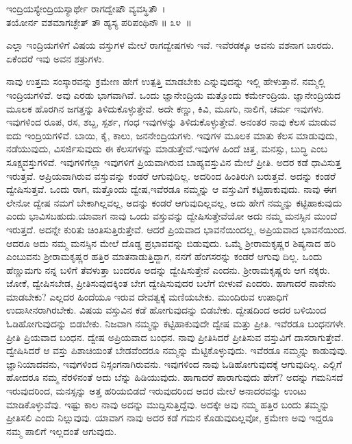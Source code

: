 \begin{shloka}
ಇಂದ್ರಿಯಸ್ಯೇಂದ್ರಿಯಸ್ಯಾರ್ಥೇ ರಾಗದ್ವೇಷೌ ವ್ಯವಸ್ಥಿತೌ~।\\ತಯೋರ್ನ ವಶಮಾಗಚ್ಛೇತ್ ತೌ ಹ್ಯಸ್ಯ ಪರಿಪಂಥಿನೌ \hfill॥ ೩೪~॥
\end{shloka}

\begin{artha}
ಎಲ್ಲಾ ಇಂದ್ರಿಯಗಳಿಗೆ ವಿಷಯ ವಸ್ತುಗಳ ಮೇಲೆ ರಾಗದ್ವೇಷಗಳು ಇವೆ. ಇವೆರಡಕ್ಕೂ ಅವನು ವಶನಾಗ ಬಾರದು. ಏಕೆಂದರೆ ಇವು ಅವನ ಶತ್ರುಗಳು.
\end{artha}

ನಾವು ಉತ್ತಮ ಸಂಸ್ಕಾರವನ್ನು ಕ್ರಮೇಣ ಹೇಗೆ ಉತ್ಪತ್ತಿ ಮಾಡಬೇಕು ಎನ್ನುವುದನ್ನು ಇಲ್ಲಿ ಹೇಳುತ್ತಾನೆ. ನಮ್ಮಲ್ಲಿ ಇಂದ್ರಿಯಗಳಿವೆ. ಅವು ಎರಡು ಭಾಗವಾಗಿವೆ. ಒಂದು ಜ್ಞಾನೇಂದ್ರಿಯ ಮತ್ತೊಂದು ಕರ್ಮೇಂದ್ರಿಯ. ಜ್ಞಾನೇಂದ್ರಿಯದ ಮೂಲಕ ಹೊರಗಿನ ಜಗತ್ತನ್ನು ತಿಳಿದುಕೊಳ್ಳುತ್ತೇವೆ. ಅದೇ ಕಣ್ಣು, ಕಿವಿ, ಮೂಗು, ನಾಲಿಗೆ, ಚರ್ಮ ಇವುಗಳು. ಇವುಗಳಿಂದ ರೂಪ, ರಸ, ಶಬ್ದ, ಸ್ಪರ್ಶ, ಗಂಧ ಇವುಗಳನ್ನು ತಿಳಿದುಕೊಳ್ಳುತ್ತೇವೆ. ಅನಂತರ ನಾವು ಕೆಲಸ ಮಾಡುವ ಐದು ಇಂದ್ರಿಯಗಳಿವೆ. ಬಾಯಿ, ಕೈ, ಕಾಲು, ಜನನೇಂದ್ರಿಯಗಳು. ಇವುಗಳ ಮೂಲಕ ಮಾತು ಕೆಲಸ ಮಾಡುವುದು, ನಡೆಯುವುದು, ವಿಸರ್ಜಿಸುವುದು ಈ ಕೆಲಸಗಳನ್ನು ಮಾಡುತ್ತೇವೆ.\break ಇವುಗಳ ಹಿಂದೆ ಚಿತ್ತ, ಮನಸ್ಸು, ಬುದ್ಧಿ ಎಂಬ ಸೂಕ್ಷ್ಮವಸ್ತುಗಳಿವೆ. ಇವುಗಳಿಗೆಲ್ಲಾ ಇವುಗಳಿಗೆ ಪ್ರಿಯವಾಗಿರುವ ಬಾಹ್ಯವಸ್ತುವಿನ ಮೇಲೆ ಪ್ರೀತಿ. ಅದರ ಕಡೆ ಧಾವಿಸುತ್ತ ಇರುತ್ತವೆ. ಅಪ್ರಿಯವಾಗಿರುವ ವಸ್ತುವನ್ನು ಕಂಡರೆ ಆಗುವುದಿಲ್ಲ. ಅದರಿಂದ ಹಿಂತಿರುಗಿ ಬರುತ್ತವೆ. ಅದನ್ನು ಕಂಡರೆ ದ್ವೇಷಿಸುತ್ತವೆ. ಒಂದು ರಾಗ, ಮತ್ತೊಂದು ದ್ವೇಷ,ಇವೆರಡೂ ನಮ್ಮನ್ನು ಆ ವಸ್ತುವಿಗೆ ಕಟ್ಟಿಹಾಕುವುದು. ನಾವು ಈಗ ಲೇನೋ ದ್ವೇಷ ನಮಗೆ ಬೇಕಾಗಿಲ್ಲವಲ್ಲ, ಅದನ್ನು ಕಂಡರೆ ಆಗುವುದಿಲ್ಲವಲ್ಲ, ಅದು ಹೇಗೆ ನಮ್ಮನ್ನು ಕಟ್ಟಿಹಾಕುವುದು ಎಂದು ಭಾವಿಸಬಹುದು.\break ಯಾವಾಗ ನಾವು ಒಂದು ವಸ್ತುವನ್ನು ದ್ವೇಷಿಸುತ್ತೇವೆಯೋ ಅದು ನಮ್ಮ ಮನಸ್ಸಿನ ಮುಂದೆ ಇರುತ್ತದೆ. ಅದನ್ನೇ ಕುರಿತು ಚಿಂತಿಸುತ್ತಿರುತ್ತೇವೆ. ಆದರೆ ಪ್ರಿಯವಾದ ಭಾವನೆಯಿಂದಲ್ಲ, ಅಪ್ರಿಯವಾದ ಭಾವನೆಯಿಂದ. ಆದರೂ ಅದು ನಮ್ಮ ಮನಸ್ಸಿನ ಮೇಲೆ ದೊಡ್ಡ ಪ್ರಭಾವವನ್ನು ಬಿಡುವುದು. ಒಮ್ಮೆ ಶ‍್ರೀರಾಮಕೃಷ್ಣರ ಶಿಷ್ಯನಾದ ಹರಿ ಎಂಬುವನು ಶ‍್ರೀರಾಮಕೃಷ್ಣರ ಹತ್ತಿರ ಮಾತನಾಡುತ್ತಿದ್ದಾಗ, ನನಗೆ ಹೆಂಗಸರನ್ನು ಕಂಡರೆ ಆಗುವು ದಿಲ್ಲ. ಒಂದು ಹೆಣ್ಣುಮಗು ನನ್ನ ಬಳಿಗೆ ತೆವಳುತ್ತಾ ಬಂದರೂ ಅದನ್ನು ದ್ವೇಷಿಸುತ್ತೇನೆ ಎಂದನು. ಶ‍್ರೀರಾಮಕೃಷ್ಣರು ಆಗ ನಕ್ಕರು. ಜೋಕೆ, ದ್ವೇಷಿಸಬೇಡ, ಪ್ರೀತಿಸುವುದಕ್ಕಿಂತ ಬೇಗ ದ್ವೇಷಿಸುವುದರ ಬಲೆಗೆ ಬೀಳುವೆ ಎಂದರು. ಹಾಗಾದರೆ ನಾವೇನು ಮಾಡಬೇಕು? ಎಲ್ಲದರ ಹಿಂದೆಯೂ ಇರುವ ದೇವತ್ವಕ್ಕೆ ಮಣಿಯಬೇಕು. ಮುಂದಿರುವ ಉಪಾಧಿಗೆ ಉದಾಸೀನರಾಗಿರಬೇಕು. ವಿಷಯ ವಸ್ತುವಿನ ಕಡೆ ಹೋಗುವುದನ್ನು ಬಿಡಬೇಕು. ದ್ವೇಷದಿಂದ ಅದರ ಬಳಿಯಿಂದ ಓಡಿಹೋಗುವುದನ್ನು ಬಿಡಬೇಕು. ನಿಜವಾಗಿ ನಮ್ಮನ್ನು ಕಟ್ಟಿಹಾಕುವುದೇ ದ್ವೇಷ ಮತ್ತು ಪ್ರೀತಿ. ಇವೆರಡೂ ಬಂಧನಗಳೇ. ಪ್ರೀತಿ ಪ್ರಿಯವಾದ ಬಂಧನ. ದ್ವೇಷ ಅಪ್ರಿಯವಾದ ಬಂಧನ. ನಾವು ಪ್ರೀತಿಸಿದರೆ ಪ್ರೀತಿಸುವ ವಸ್ತುವಿಗೆ ದಾಸರಾಗುತ್ತೇವೆ. ದ್ವೇಷಿಸಿದರೆ ಆ ವಸ್ತು ಪಿಶಾಚಿಯಂತೆ ಬೇಡವೆಂದರೂ ನಮ್ಮನ್ನು ಮೆಟ್ಟಿಕೊಳ್ಳುವುದು. ಇವೆರಡೂ ನಮ್ಮನ್ನು ಕಾಡುವುವು. ಜ್ಞಾನಿಯಾದವನು, ಇವುಗಳಿಂದ ನಿಸ್ಸಂಗನಾಗಿರುವನು. ಇವುಗಳಿಂದ ನಾವು ಓಡಿಹೋಗುವುದಕ್ಕೆ ಆಗುವುದಿಲ್ಲ. ಎಲ್ಲಿಗೆ ಹೋದರೂ ನಮ್ಮ ನೆರಳಿನಂತೆ ಅದು ಬೆನ್ನು ಹಿಡಿಯುವುದು. ಹಾಗಾದರೆ ಪಾರಾಗುವುದು ಹೇಗೆ? ಅದನ್ನು ಗಮನಿಸದೆ ಇರುವುದರಿಂದ, ಮನಸ್ಸನ್ನು ಅತ್ತ ಹರಿಯಬಿಡದೆ ಇರುವುದರಿಂದ ಅದರ ಮೇಲೆ ಅನಾದರವನ್ನು ಉಂಟು ಮಾಡಿಕೊಳ್ಳುವೆವು. ಇಷ್ಟು ಕಾಲ ನಾವು ಅದನ್ನು ಮುದ್ದಿಸುತ್ತಿದ್ದೆವು. ಅದಕ್ಕೇ ಅವು ನಮ್ಮ ಹತ್ತಿರ ಬಂದು ತಮ್ಮನ್ನು ಪ್ರೀತಿಸಲಿ ಎಂದು ನಿಲ್ಲುವುವು. ಯಾವಾಗ ನಾವು ಅದರ ಕಡೆ ಗಮನ ಕೊಡುವುದಿಲ್ಲವೋ, ಕ್ರಮೇಣ ಅವು ಇದ್ದರೂ ನಮ್ಮ ಪಾಲಿಗೆ ಇಲ್ಲದಂತೆ ಆಗುವುದು.


